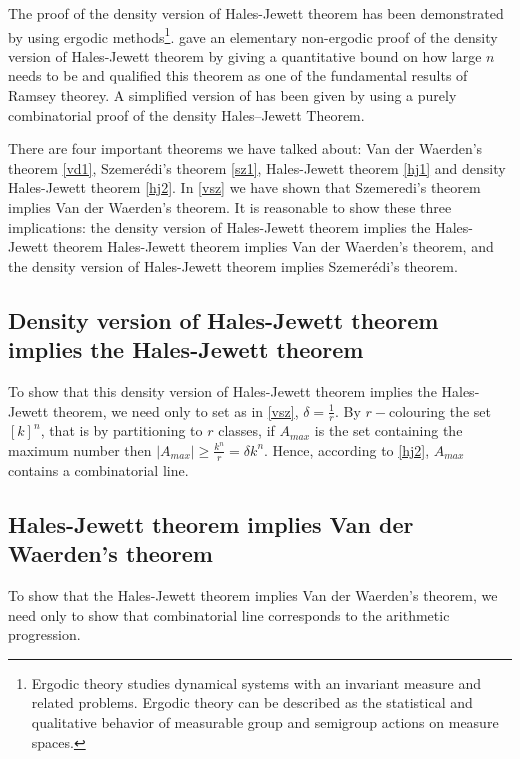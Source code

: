 The proof of the density version of Hales-Jewett theorem has been demonstrated by \cite{furstenberg1991density} using ergodic methods\footnote{Ergodic theory studies dynamical systems with an invariant measure and related problems. Ergodic theory can be described as the statistical and qualitative behavior of measurable group and semigroup actions on measure spaces.}. \cite{polymath2012new} gave an elementary non-ergodic proof of the density version of Hales-Jewett theorem by giving a quantitative bound on how large $n$ needs to be and qualified this theorem as one of the fundamental results of Ramsey theorey. A simplified version of \cite{polymath2012new} has been given by \cite{dodos2013simple} using  a purely combinatorial proof of the density Hales–Jewett Theorem.

There are four important theorems we have talked about: Van der Waerden's theorem \eqref{vd1}, Szemerédi's theorem \eqref{sz1}, Hales-Jewett theorem \eqref{hj1} and density Hales-Jewett theorem \eqref{hj2}. 
In \eqref{vsz} we have shown that Szemeredi's theorem implies Van der Waerden's theorem. It is reasonable to show these three implications: the density version of Hales-Jewett theorem implies the Hales-Jewett theorem
Hales-Jewett theorem implies  Van der Waerden's theorem, and the density version of Hales-Jewett theorem implies Szemerédi's theorem.

\subsection{Density version of Hales-Jewett theorem implies the Hales-Jewett theorem}

To show that this density version of Hales-Jewett theorem implies the Hales-Jewett theorem, we need only to set as in  \eqref{vsz}, $\delta=\frac{1}{r}.$ By $r-$colouring the set $[k]^n$, that is by partitioning to $r$ classes,  if $A_{max}$ is the set containing the maximum number then $|A_{max}| \geq \frac{k^n}{r}=\delta k^n.$ Hence, according to \eqref{hj2}, $A_{max}$ contains a combinatorial line.

\subsection{Hales-Jewett theorem implies Van der Waerden's theorem}

To show that the Hales-Jewett theorem implies Van der Waerden's theorem, we need only to show that combinatorial line corresponds to the arithmetic progression.


